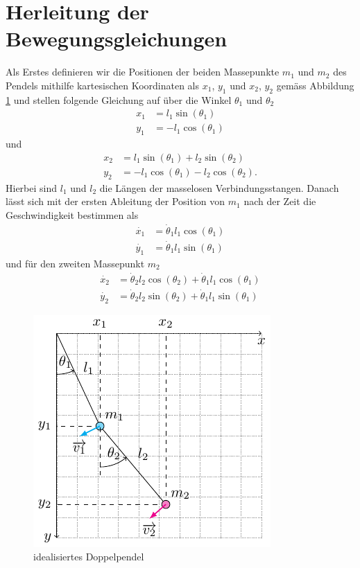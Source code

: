 
\section{Herleitung der Bewegungsgleichungen}
Als Erstes definieren wir die Positionen der beiden Massepunkte 
\(m_1\) und \(m_2\) des Pendels mithilfe kartesischen Koordinaten 
als \(x_1\), \(y_1\) und \(x_2\), \(y_2\) gemäss Abbildung \ref{fig:pendulum} 
und stellen folgende Gleichung auf über die Winkel \(\theta_1\) und \(\theta_2\)
\begin{align}
    x_1 &= l_1 \sin(\theta_1)\\
    y_1 &= -l_1 \cos(\theta_1)
\end{align}
und
\begin{align}
    x_2 &= l_1 \sin(\theta_1) + l_2 \sin(\theta_2) \\
    y_2 &= -l_1 \cos(\theta_1) - l_2 \cos(\theta_2).  
\end{align}
Hierbei sind \(l_1\) und \(l_2\) die Längen der masselosen Verbindungsstangen.
Danach lässt sich mit der ersten Ableitung der Position von
\(m_1\) nach der Zeit die Geschwindigkeit bestimmen als
\begin{align}
    \dot{x_1} &= \dot{\theta}_1 l_1 \cos(\theta_1) \\
    \dot{y_1} &= \dot{\theta}_1 l_1 \sin(\theta_1) 
\end{align}
und für den zweiten Massepunkt \(m_2\) 
\begin{align}
    \dot{x_2} &= \dot{\theta}_2 l_2 \cos(\theta_2) 
    + \dot{\theta}_1 l_1 \cos(\theta_1) \\
    \dot{y_2} &= \dot{\theta}_2 l_2 \sin(\theta_2) 
    + \dot{\theta}_1 l_1 \sin(\theta_1)
\end{align}

\begin{figure}
    \centering
    \includegraphics{papers/doppelpendel/images/pendel_pic.pdf}
    \caption{idealisiertes Doppelpendel}
    \label{fig:pendulum}
\end{figure}

